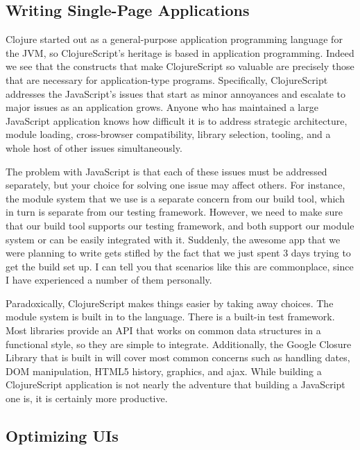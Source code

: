 \documentclass[10pt,twoside,openright]{memoir}
\begin{document}
\subsection{Writing Single-Page Applications}

Clojure started out as a general-purpose application programming
language for the JVM, so ClojureScript's heritage is based in
application programming. Indeed we see that the constructs that make
ClojureScript so valuable are precisely those that are necessary for
application-type programs. Specifically, ClojureScript addresses the
JavaScript's issues that start as minor annoyances and escalate to major
issues as an application grows. Anyone who has maintained a large
JavaScript application knows how difficult it is to address strategic
architecture, module loading, cross-browser compatibility, library
selection, tooling, and a whole host of other issues simultaneously.

The problem with JavaScript is that each of these issues must be
addressed separately, but your choice for solving one issue may affect
others. For instance, the module system that we use is a separate
concern from our build tool, which in turn is separate from our testing
framework. However, we need to make sure that our build tool supports
our testing framework, and both support our module system or can be
easily integrated with it. Suddenly, the awesome app that we were
planning to write gets stifled by the fact that we just spent 3 days
trying to get the build set up. I can tell you that scenarios like this
are commonplace, since I have experienced a number of them personally.

Paradoxically, ClojureScript makes things easier by taking away choices.
The module system is built in to the language. There is a built-in test
framework. Most libraries provide an API that works on common data
structures in a functional style, so they are simple to integrate.
Additionally, the Google Closure Library that is built in will cover
most common concerns such as handling dates, DOM manipulation, HTML5
history, graphics, and ajax. While building a ClojureScript application
is not nearly the adventure that building a JavaScript one is, it is
certainly more productive.

\subsection{Optimizing UIs}
\end{document}
